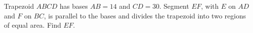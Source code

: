 Trapezoid $ABCD$ has bases $AB=14$ and $CD=30$. Segment $EF$, with $E$ on $AD$ and $F$ on $BC$, is parallel to the bases and divides the trapezoid into two regions of equal area. Find $EF$.
